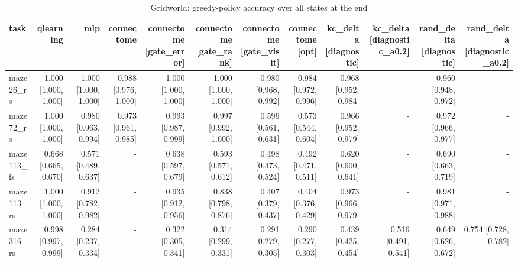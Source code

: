 \begin{table}[t]
\centering
\small
\begin{tabular}{lrrrrrrrrrrr}
\toprule
task & qlearning & mlp & connectome & connectome [gate\_error] & connectome [gate\_rank] & connectome [gate\_visit] & connectome [opt] & kc\_delta [diagnostic] & kc\_delta [diagnostic\_a0.2] & rand\_delta [diagnostic] & rand\_delta [diagnostic\_a0.2] \\
\midrule
maze26\_rs & 1.000 [1.000, 1.000] & 1.000 [1.000, 1.000] & 0.988 [0.976, 1.000] & 1.000 [1.000, 1.000] & 1.000 [1.000, 1.000] & 0.980 [0.968, 0.992] & 0.984 [0.972, 0.996] & 0.968 [0.952, 0.984] & - & 0.960 [0.948, 0.972] & - \\
maze72\_rs & 1.000 [1.000, 1.000] & 0.980 [0.963, 0.994] & 0.973 [0.961, 0.985] & 0.993 [0.987, 0.999] & 0.997 [0.992, 1.000] & 0.596 [0.561, 0.631] & 0.573 [0.544, 0.604] & 0.966 [0.952, 0.979] & - & 0.972 [0.966, 0.977] & - \\
maze113\_fs & 0.668 [0.665, 0.670] & 0.571 [0.489, 0.637] & - & 0.638 [0.597, 0.679] & 0.593 [0.571, 0.612] & 0.498 [0.473, 0.524] & 0.492 [0.471, 0.511] & 0.620 [0.600, 0.641] & - & 0.690 [0.663, 0.719] & - \\
maze113\_rs & 1.000 [1.000, 1.000] & 0.912 [0.782, 0.982] & - & 0.935 [0.912, 0.956] & 0.838 [0.798, 0.876] & 0.407 [0.379, 0.437] & 0.404 [0.376, 0.429] & 0.973 [0.966, 0.979] & - & 0.981 [0.971, 0.988] & - \\
maze316\_rs & 0.998 [0.997, 0.999] & 0.284 [0.237, 0.334] & - & 0.322 [0.305, 0.341] & 0.314 [0.299, 0.331] & 0.291 [0.279, 0.305] & 0.290 [0.277, 0.303] & 0.439 [0.425, 0.454] & 0.516 [0.491, 0.541] & 0.649 [0.626, 0.672] & 0.754 [0.728, 0.782] \\
\bottomrule
\end{tabular}
\caption{Gridworld: greedy-policy accuracy over all states at the end}
\label{tab:gridworld_final_policy_acc}
\end{table}